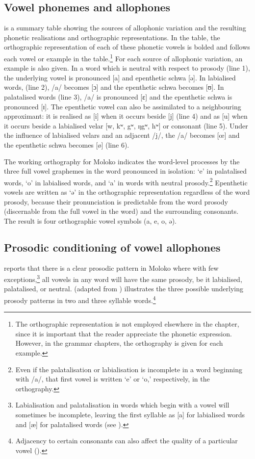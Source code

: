 \subsection{Vowel phonemes and allophones}\label{sec:2.3.1}
\hypertarget{RefHeading1210561525720847}{}
 is a summary table showing the sources of allophonic variation and the resulting phonetic realisations and orthographic representations. In the table, the orthographic representation of each of these phonetic vowels is bolded and follows each vowel or example in the table.\footnote{The orthographic representation is not employed elsewhere in the chapter, since it is important that the reader appreciate the phonetic expression. However, in the grammar chapters, the orthography is given for each example. } For each source of allophonic variation, an example is also given. In a word which is neutral with respect to prosody (line 1), the underlying vowel is pronounced [a] and epenthetic schwa [ə]. In labialised words, (line 2), /a/ becomes [ɔ] and the epenthetic schwa becomes [ʊ].  In palatalised words (line 3), /a/ is pronounced [ɛ] and the epenthetic schwa is pronounced [ɪ]. The epenthetic vowel can also be assimilated to a neighbouring approximant: it is realised as [i] when it occurs beside [j] (line 4) and as [u] when it occurs beside a labialised velar [w, kʷ, gʷ, ŋgʷ, hʷ] or consonant (line 5). Under the influence of labialised velars and an adjacent /j/, the /a/ becomes [œ] and the epenthetic schwa becomes [ø] (line 6).

The working orthography for Moloko \citep{Friesen2001} indicates the word-level processes by the three full vowel graphemes in the word pronounced in isolation: ‘e’ in palatalised words, ‘o’ in labialised words, and ‘a’ in words with neutral prosody.\footnote{Even if the palatalisation or labialisation is incomplete in a word beginning with /a/, that first vowel is written ‘e’ or ‘o,’ respectively, in the orthography. }  Epenthetic vowels are written as ‘ə’ in the orthographic representation regardless of the word prosody, because their pronunciation is predictable from the word prosody (discernable from the full vowel in the word) and the surrounding consonants.  The result is four orthographic vowel symbols (a, e, o, ə).

\subsection{Prosodic conditioning of vowel allophones}\label{sec:2.3.2}
\hypertarget{RefHeading1210581525720847}{}
\citet{Bow1997c} reports that there is a clear prosodic pattern in Moloko where with  few exceptions,\footnote{Labialisation and palatalisation in words which begin with a vowel will sometimes be incomplete, leaving the first syllable as [a] for labialised words and [æ] for palatalised words (see ).} all vowels in any word will have the same prosody, be it labialised, palatalised, or neutral.   (adapted from \citealt{Bow1997c}) illustrates the three possible underlying prosody patterns in two and three syllable words.\footnote{Adjacency to certain consonants can also affect the quality of a particular vowel ().}


